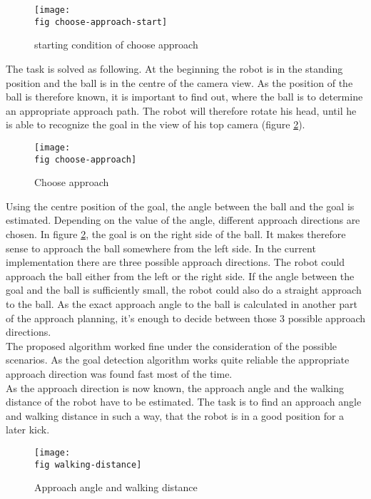 \begin{figure}[ht]
	\texttt{[image: \\fig choose-approach-start]}
	\caption{starting condition of choose approach}
	\label{j figure starting condition choose-approach}
\end{figure}

The task is solved as following. At the beginning the robot is in the standing position and the ball is in the centre of the camera view. As the position of the ball is therefore known, it is important to find out, where the ball is to determine an appropriate approach path. The robot will therefore rotate his head, until he is able to recognize the goal in the view of his top camera (figure \ref{j figure choose-approach}).

\begin{figure}[ht]
	\texttt{[image: \\fig choose-approach]}
	\caption{Choose approach}
	\label{j figure choose-approach}
\end{figure}

Using the centre position of the goal, the angle between the ball and the goal is estimated. Depending on the value of the angle, different approach directions are chosen. In figure \ref{j figure choose-approach}, the goal is on the right side of the ball. It makes therefore sense to approach the ball somewhere from the left side. In the current implementation there are three possible approach directions. The robot could approach the ball either from the left or the right side. If the angle between the goal and the ball is sufficiently small, the robot could also do a straight approach to the ball. As the exact approach angle to the ball is calculated in another part of the approach planning, it's enough to decide between those 3 possible approach directions.\\
The proposed algorithm worked fine under the consideration of the possible scenarios. As the goal detection algorithm works quite reliable the appropriate approach direction was found fast most of the time.\\
As the approach direction is now known, the approach angle and the walking distance of the robot have to be estimated. The task is to find an approach angle and walking distance in such a way, that the robot is in a good position for a later kick.

\begin{figure}[ht]
	\texttt{[image: \\fig walking-distance]}
	\caption{Approach angle and walking distance}
	\label{j figure approach angle and walking distance}
\end{figure}

